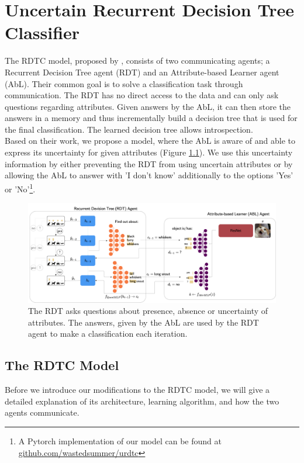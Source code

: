\documentclass[a4paper,cleardoubleempty,BCOR1cm, 11pt]{report}
\begin{document}
\chapter{Uncertain Recurrent Decision Tree Classifier} %
The RDTC model, proposed by \citet{alaniz2019explainable}, consists of two communicating agents; a Recurrent Decision Tree agent (RDT) and an Attribute-based Learner agent (AbL). Their common goal is to solve a classification task through communication. The RDT has no direct access to the data and can only ask questions regarding attributes. Given answers by the AbL, it can then store the answers in a memory and thus incrementally build a decision tree that is used for the final classification. The learned decision tree allows introspection.\\
Based on their work, we propose a model, where the AbL is aware of and able to express its uncertainty for given attributes (Figure \ref{fig:uncertainRDTC}). We use this uncertainty information by either preventing the RDT from using uncertain attributes or by allowing the AbL to answer with 'I don't know' additionally to the options 'Yes' or 'No'\footnote{A Pytorch implementation of our model can be found at \url{github.com/wastedsummer/urdtc}}.



\begin{figure}
	\centering
	\includegraphics[width=1\textwidth]{images/uncertaintRDTC.pdf} 
	\caption{The RDT asks questions about presence, absence or uncertainty of attributes. The answers, given by the AbL are used by the RDT agent to make a classification each iteration.}
	\label{fig:uncertainRDTC}
\end{figure}

\section{The RDTC Model} 
Before we introduce our modifications to the RDTC model, we will give a detailed explanation of its architecture, learning algorithm, and how the two agents communicate.
\end{document}
